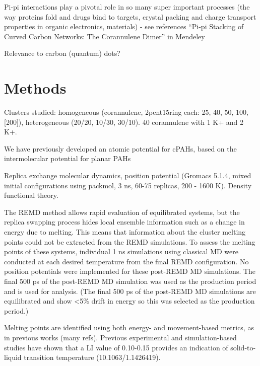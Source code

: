 

Pi-pi interactions play a pivotal role in so many super important processes (the way proteins fold and drugs bind to targets, crystal packing and charge transport properties in organic electronics, materials) - see references “Pi-pi Stacking of Curved Carbon Networks: The Corannulene Dimer” in Mendeley

Relevance to carbon (quantum) dots?




\section{Methods}
Clusters studied: homogeneous (corannulene, 2pent15ring each: 25, 40, 50, 100, [200]), heterogeneous (20/20, 10/30, 30/10).
40 corannulene with 1 K+ and 2 K+.

We have previously developed an atomic potential for cPAHs, based on the intermolecular potential for planar PAHs 



Replica exchange molecular dynamics, position potential (Gromacs 5.1.4, mixed initial configurations using packmol, 3 ns, 60-75 replicas, 200 - 1600 K).
Density functional theory.

The REMD method allows rapid evaluation of equilibrated systems, but the replica swapping process hides local ensemble information such as a change in energy due to melting. This means that information about the cluster melting points could not be extracted from the REMD simulations. To assess the melting points of these systems, individual 1 ns simulations using classical MD were conducted at each desired temperature from the final REMD configuration. No position potentials were implemented for these post-REMD MD simulations.
The final 500 ps of the post-REMD MD simulation was used as the production period and is used for analysis.
(The final 500 ps of the post-REMD MD simulations are equilibrated and show <5\% drift in energy so this was selected as the production period.)

Melting points are identified using both energy- and movement-based metrics, as in previous works (many refs).
Previous experimental and simulation-based studies have shown that a LI value of 0.10-0.15 provides an indication of solid-to-liquid transition temperature (10.1063/1.1426419).

